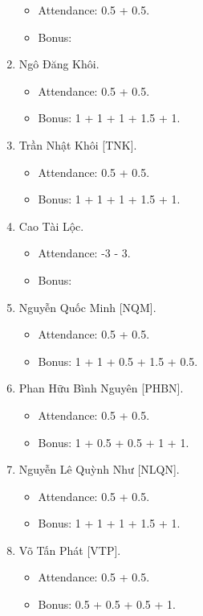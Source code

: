 \documentclass{article}
\begin{document}
\begin{enumerate}
    \begin{itemize}
        \item Attendance: 0.5 + 0.5.
        \item Bonus:
    \end{itemize}
    \item {\sc Ngô Đăng Khôi.}
    \begin{itemize}
        \item Attendance: 0.5 + 0.5.
        \item Bonus: 1 + 1 + 1 + 1.5 + 1.
    \end{itemize}
    \item {\sc Trần Nhật Khôi [TNK].}
    \begin{itemize}
        \item Attendance: 0.5 + 0.5.
        \item Bonus: 1 + 1 + 1 + 1.5 + 1.
    \end{itemize}
    \item {\sc Cao Tài Lộc.}
    \begin{itemize}
        \item Attendance: -3 - 3.
        \item Bonus:
    \end{itemize}
    \item {\sc Nguyễn Quốc Minh [NQM].}
    \begin{itemize}
        \item Attendance: 0.5 + 0.5.
        \item Bonus: 1 + 1 + 0.5 + 1.5 + 0.5.
    \end{itemize}
    \item {\sc Phan Hữu Bình Nguyên [PHBN].}
    \begin{itemize}
        \item Attendance: 0.5 + 0.5.
        \item Bonus: 1 + 0.5 + 0.5 + 1 + 1.
    \end{itemize}
    \item {\sc Nguyễn Lê Quỳnh Như [NLQN].}
    \begin{itemize}
        \item Attendance: 0.5 + 0.5.
        \item Bonus: 1 + 1 + 1 + 1.5 + 1.
    \end{itemize}
    \item {\sc Võ Tấn Phát [VTP].}
    \begin{itemize}
        \item Attendance: 0.5 + 0.5.
        \item Bonus: 0.5 + 0.5 + 0.5 + 1.

\end{itemize}
\end{enumerate}
\end{document}
